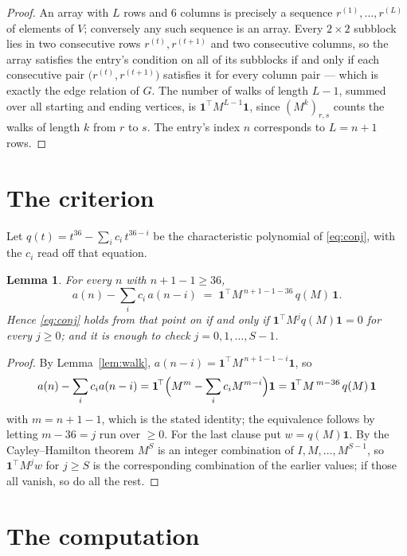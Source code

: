 \documentclass[11pt,a4paper]{article}
\theoremstyle{plain}
\newtheorem{lemma}[theorem]{Lemma}
\theoremstyle{definition}
\begin{document}
\begin{proof}
An array with $L$ rows and $6$ columns is precisely a sequence
$r^{(1)},\dots,r^{(L)}$ of elements of $V$; conversely any such sequence is an array.
Every $2\times2$ subblock lies in two consecutive rows $r^{(t)},r^{(t+1)}$ and two
consecutive columns, so the array satisfies the entry's condition on all of its subblocks
if and only if each consecutive pair $\bigl(r^{(t)},r^{(t+1)}\bigr)$ satisfies it for
every column pair --- which is exactly the edge relation of $G$. The number of walks of
length $L-1$, summed over all starting and ending vertices, is
$\mathbf{1}^{\!\top}M^{L-1}\mathbf{1}$, since $(M^{k})_{r,s}$ counts the walks of
length $k$ from $r$ to $s$. The entry's index $n$ corresponds to $L=n+1$ rows.
\end{proof}

\section{The criterion}

Let $q(t)=t^{36}-\sum_i c_i\,t^{36-i}$ be the characteristic polynomial of
\eqref{eq:conj}, with the $c_i$ read off that equation.

\begin{lemma}\label{lem:crit}
For every $n$ with $n+1-1\ge36$,
\[
a(n)-\sum_i c_i\,a(n-i)\;=\;\mathbf{1}^{\!\top}M^{\,n+1-1-36}\,q(M)\,\mathbf{1} .
\]
Hence \eqref{eq:conj} holds from that point on if and only if
$\mathbf{1}^{\!\top}M^{j}q(M)\mathbf{1}=0$ for every $j\ge0$; and it is enough to check
$j=0,1,\dots,S-1$.
\end{lemma}

\begin{proof}
By Lemma~\ref{lem:walk}, $a(n-i)=\mathbf{1}^{\!\top}M^{\,n+1-1-i}\mathbf{1}$, so
\[
a(n)-\sum_i c_i a(n-i)
=\mathbf{1}^{\!\top}\Bigl(M^{m}-\sum_i c_i M^{m-i}\Bigr)\mathbf{1}
=\mathbf{1}^{\!\top}M^{\,m-36}\,q(M)\,\mathbf{1}
\]
with $m=n+1-1$, which is the stated identity; the equivalence follows by letting
$m-36=j$ run over $\ge0$. For the last clause put $w=q(M)\mathbf{1}$. By the
Cayley--Hamilton theorem $M^{S}$ is an integer combination of $I,M,\dots,M^{S-1}$, so
$\mathbf{1}^{\!\top}M^{j}w$ for $j\ge S$ is the corresponding combination of the earlier
values; if those all vanish, so do all the rest.
\end{proof}

\section{The computation}
\end{document}

